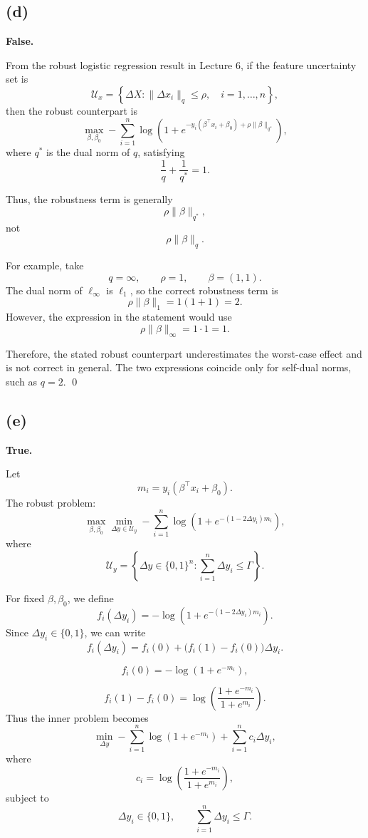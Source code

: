 \documentclass{article}
\begin{document}
\vspace{5mm}
\subsection*{(d)}
\textbf{False.}

From the robust logistic regression result in Lecture 6, if the feature
uncertainty set is
\[
\mathcal{U}_x
=
\left\{
\Delta X:
\|\Delta x_i\|_q \leq \rho,
\quad i=1,\ldots,n
\right\},
\]
then the robust counterpart is
\[
\max_{\beta,\beta_0}
-\sum_{i=1}^n
\log\left(
1+
e^{-y_i(\beta^\top x_i+\beta_0)
+\rho\|\beta\|_{q^*}}
\right),
\]
where $q^*$ is the dual norm of $q$, satisfying
\[
\frac{1}{q}+\frac{1}{q^*}=1.
\]

Thus, the robustness term is generally
\[
\rho\|\beta\|_{q^*},
\]
not
\[
\rho\|\beta\|_q.
\]

For example, take
\[
q=\infty,
\qquad
\rho=1,
\qquad
\beta=(1,1).
\]
The dual norm of $\ell_\infty$ is $\ell_1$, so the correct robustness
term is
\[
\rho\|\beta\|_1
=
1(1+1)
=
2.
\]
However, the expression in the statement would use
\[
\rho\|\beta\|_\infty
=
1\cdot 1
=
1.
\]

Therefore, the stated robust counterpart underestimates the worst-case
effect and is not correct in general. The two expressions coincide only
for self-dual norms, such as $q=2$. \qed


\newpage

\vspace{5mm}
\subsection*{(e)}

\textbf{True.}

Let
\[
m_i = y_i(\beta^\top x_i+\beta_0).
\]
The robust problem: 
\[
\max_{\beta,\beta_0}
\min_{\Delta y\in\mathcal U_y}
-\sum_{i=1}^n
\log\left(
1+e^{-(1-2\Delta y_i)m_i}
\right),
\]
where
\[
\mathcal U_y
=
\left\{
\Delta y\in\{0,1\}^n:
\sum_{i=1}^n \Delta y_i\le \Gamma
\right\}.
\]

For fixed $\beta,\beta_0$, we define
\[
f_i(\Delta y_i)
=
-\log\left(
1+e^{-(1-2\Delta y_i)m_i}
\right).
\]
Since $\Delta y_i\in\{0,1\}$, we can write
\[
f_i(\Delta y_i)
=
f_i(0)
+
\bigl(f_i(1)-f_i(0)\bigr)\Delta y_i.
\]


\[
f_i(0)
=
-\log(1+e^{-m_i}),
\]

\[
f_i(1)-f_i(0)
=
\log\left(
\frac{1+e^{-m_i}}{1+e^{m_i}}
\right).
\]
Thus the inner problem becomes
\[
\min_{\Delta y}
-\sum_{i=1}^n\log(1+e^{-m_i})
+
\sum_{i=1}^n c_i\Delta y_i,
\]
where
\[
c_i
=
\log\left(
\frac{1+e^{-m_i}}{1+e^{m_i}}
\right),
\]
subject to
\[
\Delta y_i\in\{0,1\},
\qquad
\sum_{i=1}^n\Delta y_i\le\Gamma.
\]
\end{document}
